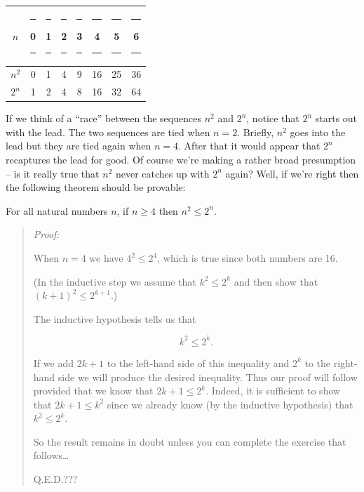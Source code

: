 \begin{center}
\begin{tabular}{c|ccccccc}
$n$   & \rule{6pt}{0pt} 0 \rule{6pt}{0pt} & \rule{6pt}{0pt} 1 \rule{6pt}{0pt} & \rule{6pt}{0pt} 2 \rule{6pt}{0pt} & \rule{6pt}{0pt} 3 \rule{6pt}{0pt} & \rule{6pt}{0pt} 4 \rule{6pt}{0pt} & \rule{6pt}{0pt} 5 \rule{6pt}{0pt} & \rule{6pt}{0pt} 6 \rule{6pt}{0pt} \\ \hline
$n^2$  & 0 & 1 & 4 & 9 & 16 & 25 & 36 \\ \hline
$2^n$ & 1 & 2 & 4 & 8 & 16 & 32 & 64 \\ 
\end{tabular}
\end{center}

If we think of a ``race'' between the sequences $n^2$ and $2^n$, notice
that $2^n$ starts out with the lead.  The two sequences are tied when 
$n=2$.  Briefly, $n^2$ goes into the lead but they are tied again when
$n=4$.  After that it would appear that $2^n$ recaptures the lead for good.
Of course we're making a rather broad presumption -- is it really true
that $n^2$ never catches up with $2^n$ again?  Well, if we're right 
then the following theorem should be provable:

\begin{thm} 
For all natural numbers $n$, if $n \geq 4$ then $n^2 \leq 2^n$.
\end{thm}
 
\begin{quote} \emph{Proof:}

 When $n=4$ we have $4^2 \leq 2^4$, which is 
true since both numbers are 16.

 (In the inductive step we assume
that $k^2 \leq 2^k$ and then show that $(k+1)^2 \leq 2^{k+1}$.)

The inductive hypothesis tells us that 

\[ k^2 \leq 2^k. \]

 
If we add $2k+1$ to the left-hand side of this inequality
and $2^k$ to the right-hand side we will produce the desired
inequality.  Thus our proof will follow provided that
we know that $2k+1 \leq 2^k$.  Indeed, it is sufficient to show
that $2k+1 \leq k^2$ since we already know (by the inductive
hypothesis) that $k^2 \leq 2^k$.

So the result remains in doubt unless you can complete the 
exercise that follows\ldots

\rule{0pt}{0pt} \newline \rule{0pt}{15pt} \hfill Q.E.D.??? \end{quote}


